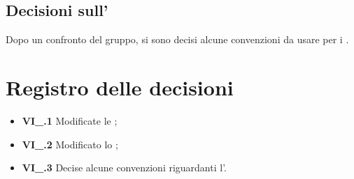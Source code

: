 \subsection{Decisioni sull'\AdR}
Dopo un confronto del gruppo, si sono decisi alcune convenzioni da usare per i .

\section{Registro delle decisioni}
\begin{itemize}
  \item \textbf{VI\_\Data.1} Modificate le \textit{\NdP};
  \item \textbf{VI\_\Data.2} Modificato lo \textit{\SdF};
  \item \textbf{VI\_\Data.3} Decise alcune convenzioni riguardanti l'\textit{\AdR}.

\end{itemize}




